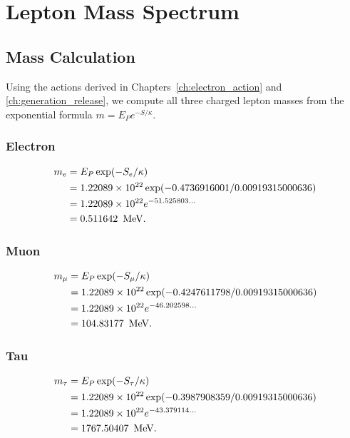 \chapter{Lepton Mass Spectrum}
\label{ch:lepton_spectrum}

\section{Mass Calculation}

Using the actions derived in Chapters~\ref{ch:electron_action} and
\ref{ch:generation_release}, we compute all three charged lepton masses
from the exponential formula \(m = E_P e^{-S/\kappa}\).

\subsection{Electron}

\[
\begin{aligned}
m_e &= E_P \exp(-S_e/\kappa) \\
    &= 1.22089 \times 10^{22} \exp(-0.4736916001 / 0.00919315000636) \\
    &= 1.22089 \times 10^{22} e^{-51.525803\ldots} \\
    &= 0.511642\ \,\text{MeV}.
\end{aligned}
\]

\subsection{Muon}

\[
\begin{aligned}
m_\mu &= E_P \exp(-S_\mu/\kappa) \\
      &= 1.22089 \times 10^{22} \exp(-0.4247611798 / 0.00919315000636) \\
      &= 1.22089 \times 10^{22} e^{-46.202598\ldots} \\
      &= 104.83177\ \,\text{MeV}.
\end{aligned}
\]

\subsection{Tau}

\[
\begin{aligned}
m_\tau &= E_P \exp(-S_\tau/\kappa) \\
       &= 1.22089 \times 10^{22} \exp(-0.3987908359 / 0.00919315000636) \\
       &= 1.22089 \times 10^{22} e^{-43.379114\ldots} \\
       &= 1767.50407\ \,\text{MeV}.
\end{aligned}
\]


